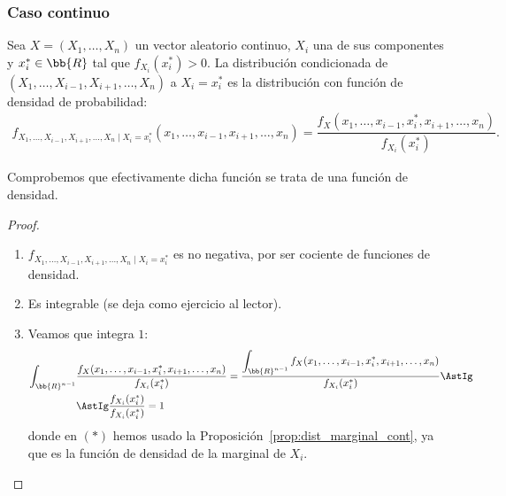\subsubsection{Caso continuo}
\begin{definicion}
    Sea $X=(X_1, \ldots, X_n)$ un vector aleatorio continuo, $X_i$ una de sus componentes y $x_i^\ast\in \bb{R}$ tal que $f_{X_i}(x_i^\ast)>0$. La distribución condicionada de $(X_1, \ldots, X_{i-1}, X_{i+1}, \ldots, X_n)$ a $X_i=x_i^\ast$ es la distribución con función de densidad de probabilidad:
    \begin{align*}
        f_{X_1, \ldots, X_{i-1}, X_{i+1}, \ldots, X_n \mid X_i=x_i^\ast}(x_1, \ldots, x_{i-1}, x_{i+1}, \ldots, x_n) =
        \dfrac{f_X(x_1, \ldots, x_{i-1}, x_i^\ast, x_{i+1}, \ldots, x_n)}{f_{X_i}(x_i^\ast)}.
    \end{align*}
\end{definicion}

Comprobemos que efectivamente dicha función se trata de una función de densidad.
\begin{proof}~
    \begin{enumerate}
        \item $f_{X_1, \ldots, X_{i-1}, X_{i+1}, \ldots, X_n \mid X_i=x_i^\ast}$ es no negativa, por ser cociente de funciones de densidad.
        \item Es integrable (se deja como ejercicio al lector).
        \item Veamos que integra $1$:
        \begin{align*}
            \int_{\bb{R}^{n-1}}& \dfrac{f_X(x_1, \ldots, x_{i-1}, x_i^\ast, x_{i+1}, \ldots, x_n)}{f_{X_i}(x_i^\ast)} 
            = \dfrac{\displaystyle \int_{\bb{R}^{n-1}} f_X(x_1, \ldots, x_{i-1}, x_i^\ast, x_{i+1}, \ldots, x_n)}{f_{X_i}(x_i^\ast)} 
            \AstIg \\ &\AstIg
            \dfrac{f_{X_i}(x_i^\ast)}{f_{X_i}(x_i^\ast)} = 1
        \end{align*}
        donde en $(\ast)$ hemos usado la Proposición~\ref{prop:dist_marginal_cont}, ya que es la función de densidad de la marginal de $X_i$.
    \end{enumerate}
\end{proof}